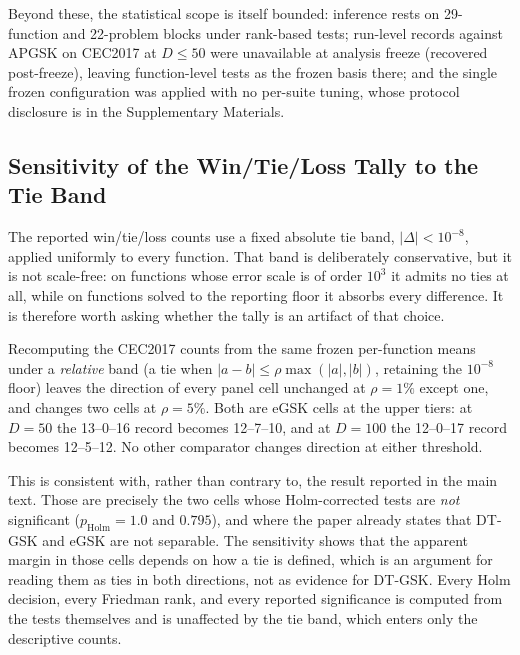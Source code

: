 \documentclass[algorithms,article,submit,moreauthors,pdftex]{Definitions/mdpi}
\newcommand{\dtgsk}{DT-GSK}
\newcommand{\apgsk}{APGSK}
\newcommand{\egsk}{eGSK}
\begin{document}
Beyond these, the statistical scope is itself bounded: inference rests
on 29-function and 22-problem blocks under rank-based tests; run-level
records against \apgsk{} on CEC2017 at $D \leq 50$ were unavailable at
analysis freeze (recovered post-freeze), leaving
function-level tests as the frozen basis there; and the single frozen
configuration was applied with no
per-suite tuning, whose protocol disclosure is in the Supplementary
Materials. %

\subsection{Sensitivity of the Win/Tie/Loss Tally to the Tie Band}\label{sec:repro:tieband}

The reported win/tie/loss counts use a fixed absolute tie band,
$|\Delta| < 10^{-8}$, applied uniformly to every function. That band is
deliberately conservative, but it is not scale-free: on functions whose error
scale is of order $10^{3}$ it admits no ties at all, while on functions solved to
the reporting floor it absorbs every difference. It is therefore worth asking
whether the tally is an artifact of that choice.

Recomputing the CEC2017 counts from the same frozen per-function means under a
\emph{relative} band (a tie when
$|a-b| \le \rho \max(|a|,|b|)$, retaining the $10^{-8}$ floor) leaves the
direction of every panel cell unchanged at $\rho = 1\%$ except one, and changes
two cells at $\rho = 5\%$. Both are \egsk{} cells at the upper tiers: at
$D = 50$ the 13--0--16 record becomes 12--7--10, and at $D = 100$ the 12--0--17
record becomes 12--5--12. No other comparator changes direction at either
threshold.

This is consistent with, rather than contrary to, the result reported in the main
text. Those are precisely the two cells whose Holm-corrected tests are \emph{not}
significant ($p_{\mathrm{Holm}} = 1.0$ and $0.795$), and where the paper already
states that \dtgsk{} and \egsk{} are not separable. The sensitivity shows that
the apparent margin in those cells depends on how a tie is defined, which is an
argument for reading them as ties in both directions, not as evidence for
\dtgsk{}. Every Holm decision, every Friedman rank, and every reported
significance is computed from the tests themselves and is unaffected by the tie
band, which enters only the descriptive counts.
\end{document}
